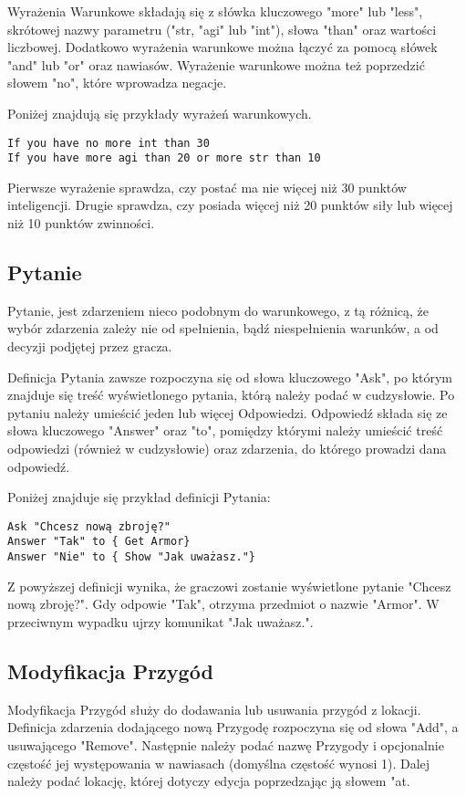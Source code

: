 \documentclass	{xmgr}
\begin{document}
Wyrażenia Warunkowe składają się z słówka kluczowego "more" lub "less", skrótowej nazwy parametru ("str, "agi" lub "int"), słowa "than" oraz wartości liczbowej. Dodatkowo wyrażenia warunkowe można łączyć za pomocą słówek "and" lub "or" oraz nawiasów. Wyrażenie warunkowe można też poprzedzić słowem "no", które wprowadza negacje.

Poniżej znajdują się przykłady wyrażeń warunkowych.

\begin{lstlisting}
If you have no more int than 30
If you have more agi than 20 or more str than 10
\end{lstlisting}
Pierwsze wyrażenie sprawdza, czy postać ma nie więcej niż 30 punktów inteligencji. Drugie sprawdza, czy posiada więcej niż 20 punktów siły lub więcej niż 10 punktów zwinności.

\subsection*{Pytanie}
Pytanie, jest zdarzeniem nieco podobnym do warunkowego, z tą różnicą, że wybór zdarzenia zależy nie od spełnienia, bądź niespełnienia warunków, a od decyzji podjętej przez gracza.

Definicja Pytania zawsze rozpoczyna się od słowa kluczowego "Ask", po którym znajduje się treść wyświetlonego pytania, którą należy podać w cudzysłowie. Po pytaniu należy umieścić jeden lub więcej Odpowiedzi. Odpowiedź składa się ze słowa kluczowego "Answer" oraz "to", pomiędzy którymi należy umieścić treść odpowiedzi (również w cudzysłowie) oraz zdarzenia, do którego prowadzi dana odpowiedź. 

Poniżej znajduje się przykład definicji Pytania:
\begin{lstlisting}
Ask "Chcesz nową zbroję?"
Answer "Tak" to { Get Armor}
Answer "Nie" to { Show "Jak uważasz."}
\end{lstlisting}
Z powyższej definicji wynika, że graczowi zostanie wyświetlone pytanie "Chcesz nową zbroję?". Gdy odpowie "Tak", otrzyma przedmiot o nazwie "Armor". W przeciwnym wypadku ujrzy komunikat "Jak uważasz.".


\subsection*{Modyfikacja Przygód}
Modyfikacja Przygód służy do dodawania lub usuwania przygód z lokacji. 
Definicja zdarzenia dodającego nową Przygodę rozpoczyna się od słowa "Add", a usuwającego "Remove". Następnie należy podać nazwę Przygody i opcjonalnie częstość jej występowania w nawiasach (domyślna częstość wynosi 1). Dalej należy podać lokację, której dotyczy edycja poprzedzając ją słowem "at.
\end{document}
